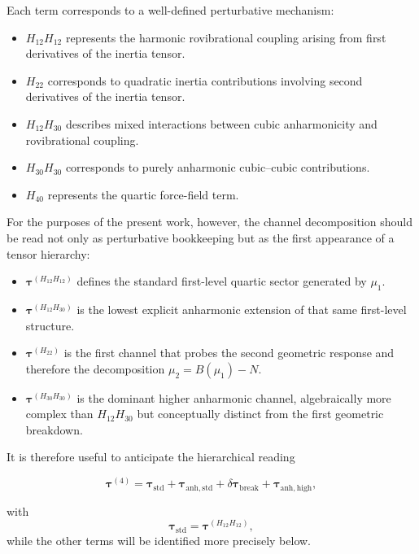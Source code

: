 \documentclass[aip,jcp,reprint]{revtex4-2}
\begin{document}
Each term corresponds to a well-defined perturbative mechanism:

\begin{itemize}
\item
$H_{12}H_{12}$ represents the harmonic rovibrational coupling arising
from first derivatives of the inertia tensor.
\item
$H_{22}$ corresponds to quadratic inertia contributions involving
second derivatives of the inertia tensor.
\item
$H_{12}H_{30}$ describes mixed interactions between cubic anharmonicity
and rovibrational coupling.
\item
$H_{30}H_{30}$ corresponds to purely anharmonic cubic--cubic
contributions.
\item
$H_{40}$ represents the quartic force-field term.
\end{itemize}

For the purposes of the present work, however, the channel decomposition
should be read not only as perturbative bookkeeping but as the first
appearance of a tensor hierarchy:

\begin{itemize}
\item
$\bm{\tau}^{(H_{12}H_{12})}$ defines the standard first-level quartic
sector generated by $\mu_1$.
\item
$\bm{\tau}^{(H_{12}H_{30})}$ is the lowest explicit anharmonic extension
of that same first-level structure.
\item
$\bm{\tau}^{(H_{22})}$ is the first channel that probes the second
geometric response and therefore the decomposition
$\mu_2 = B(\mu_1) - N$.
\item
$\bm{\tau}^{(H_{30}H_{30})}$ is the dominant higher anharmonic channel,
algebraically more complex than $H_{12}H_{30}$ but conceptually distinct
from the first geometric breakdown.
\end{itemize}

It is therefore useful to anticipate the hierarchical reading

\begin{equation}
\bm{\tau}^{(4)}
=
\bm{\tau}_{\mathrm{std}}
+
\bm{\tau}_{\mathrm{anh,std}}
+
\delta\bm{\tau}_{\mathrm{break}}
+
\bm{\tau}_{\mathrm{anh,high}},
\end{equation}

with
\begin{equation}
\bm{\tau}_{\mathrm{std}} = \bm{\tau}^{(H_{12}H_{12})},
\end{equation}
while the other terms will be identified more precisely below.
\end{document}
